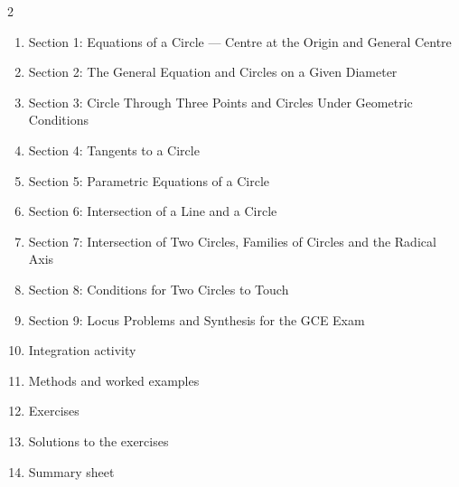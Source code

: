 \documentclass[11pt]{article}
\begin{document}
\begin{sommaire}
\begin{multicols}{2}
\begin{enumerate}
\item Section 1: Equations of a Circle — Centre at the Origin and General Centre
\item Section 2: The General Equation and Circles on a Given Diameter
\item Section 3: Circle Through Three Points and Circles Under Geometric Conditions
\item Section 4: Tangents to a Circle
\item Section 5: Parametric Equations of a Circle
\item Section 6: Intersection of a Line and a Circle
\item Section 7: Intersection of Two Circles, Families of Circles and the Radical Axis
\item Section 8: Conditions for Two Circles to Touch
\item Section 9: Locus Problems and Synthesis for the GCE Exam
\item Integration activity
\item Methods and worked examples
\item Exercises
\item Solutions to the exercises
\item Summary sheet
\end{enumerate}
\end{multicols}
\end{sommaire}
\end{document}
